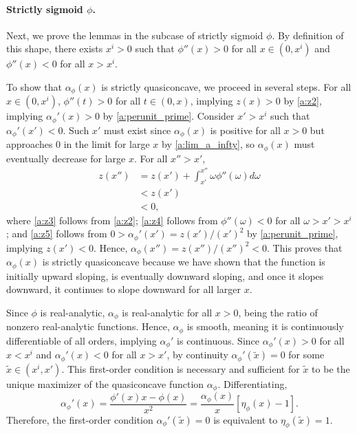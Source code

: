\documentclass[12pt]{article}
\newcommand{\efficacy}{\phi}
\newcommand{\xpoi}{x^{i}}
\newcommand{\elasticity}[1]{\eta_{#1}}
\newcommand{\perunit}[1]{\alpha_{#1}}
\newcommand{\xtilde}{\tilde{x}}
\begin{document}
\paragraph{Strictly sigmoid $\efficacy$.} 

Next, we prove the lemmas in the subcase of strictly sigmoid
$\efficacy$. By definition of this shape, there exists $\xpoi > 0$
such that $\efficacy''(x) > 0$ for all $x \in (0, \xpoi)$ and
$\efficacy''(x) < 0$ for all $x > \xpoi$.

To show that $\perunit{\efficacy}\!(x)$ is strictly quasiconcave, we
proceed in several steps. For all $x \in (0, \xpoi)$, $\efficacy''(t)
> 0$ for all $t \in (0, x)$, implying $z(x) > 0$ by \eqref{a:z2},
implying $\perunit{\efficacy}'\!(x) > 0$ by \eqref{a:perunit_prime}.
Consider $x' > \xpoi$ such that $\perunit{\efficacy}'\!(x') < 0$. Such
$x'$ must exist since $\perunit{\efficacy}\!(x)$ is positive for all
$x > 0$ but approaches 0 in the limit for large $x$ by
\eqref{a:lim_a_infty}, so $\perunit{\efficacy}\!(x)$ must eventually
decrease for large $x$. For all $x'' > x'$,
\begin{align}
z(x'') & = z(x') + \int_{x'}^{x''} \omega \efficacy''(\omega) d\omega \label{a:z3} \\
& < z(x') \label{a:z4} \\
& < 0, \label{a:z5}
\end{align}
where \eqref{a:z3} follows from \eqref{a:z2}; \eqref{a:z4} follows
from $\efficacy''(\omega) < 0$ for all $\omega > x' > \xpoi$; and
\eqref{a:z5} follows from $0 > \perunit{\efficacy}'\!(x') = z(x') /
(x')^2$ by \eqref{a:perunit_prime}, implying $z(x') < 0$. Hence,
$\perunit{\efficacy}\!(x'') = z(x'') / (x'')^2 < 0$. This proves that
$\perunit{\efficacy}\!(x)$ is strictly quasiconcave because we have
shown that the function is initially upward sloping, is eventually
downward sloping, and once it slopes downward, it continues to slope
downward for all larger $x$.

Since $\efficacy$ is real-analytic, $\perunit{\efficacy}$ is
real-analytic for all $x >0$, being the ratio of nonzero real-analytic
functions. Hence, $\perunit{\efficacy}$ is smooth, meaning it is
continuously differentiable of all orders, implying
$\perunit{\efficacy}'$ is continuous. Since $\perunit{\efficacy}'\!(x)
> 0$ for all $x < \xpoi$ and $\perunit{\efficacy}'\!(x) < 0$ for all
$x > x'$, by continuity $\perunit{\efficacy}'\!(\xtilde) = 0$ for some
$\xtilde \in (\xpoi, x')$. This first-order condition is necessary and
sufficient for $\xtilde$ to be the unique maximizer of the
quasiconcave function $\perunit{\efficacy}$. Differentiating,
\begin{equation}
\label{a:perunit_derive}
\perunit{\efficacy}'\!(x) = \frac{\efficacy'(x) x - \efficacy(x)}{x^2}
= \frac{\perunit{\efficacy}\!(x)}{x} [ \elasticity{\efficacy}\!(x) -
  1].
\end{equation}
Therefore, the first-order condition $\perunit{\efficacy}'\!(\xtilde)
= 0$ is equivalent to $\elasticity{\efficacy}\!(\xtilde) = 1$.
\end{document}
